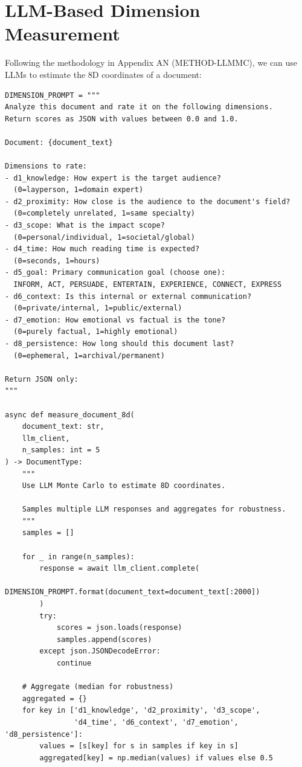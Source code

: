 \section{LLM-Based Dimension Measurement}
\label{sec:doctype-llm}

Following the methodology in Appendix AN (METHOD-LLMMC), we can use LLMs
to estimate the 8D coordinates of a document:

\begin{verbatim}
DIMENSION_PROMPT = """
Analyze this document and rate it on the following dimensions.
Return scores as JSON with values between 0.0 and 1.0.

Document: {document_text}

Dimensions to rate:
- d1_knowledge: How expert is the target audience?
  (0=layperson, 1=domain expert)
- d2_proximity: How close is the audience to the document's field?
  (0=completely unrelated, 1=same specialty)
- d3_scope: What is the impact scope?
  (0=personal/individual, 1=societal/global)
- d4_time: How much reading time is expected?
  (0=seconds, 1=hours)
- d5_goal: Primary communication goal (choose one):
  INFORM, ACT, PERSUADE, ENTERTAIN, EXPERIENCE, CONNECT, EXPRESS
- d6_context: Is this internal or external communication?
  (0=private/internal, 1=public/external)
- d7_emotion: How emotional vs factual is the tone?
  (0=purely factual, 1=highly emotional)
- d8_persistence: How long should this document last?
  (0=ephemeral, 1=archival/permanent)

Return JSON only:
"""

async def measure_document_8d(
    document_text: str,
    llm_client,
    n_samples: int = 5
) -> DocumentType:
    """
    Use LLM Monte Carlo to estimate 8D coordinates.

    Samples multiple LLM responses and aggregates for robustness.
    """
    samples = []

    for _ in range(n_samples):
        response = await llm_client.complete(
            DIMENSION_PROMPT.format(document_text=document_text[:2000])
        )
        try:
            scores = json.loads(response)
            samples.append(scores)
        except json.JSONDecodeError:
            continue

    # Aggregate (median for robustness)
    aggregated = {}
    for key in ['d1_knowledge', 'd2_proximity', 'd3_scope',
                'd4_time', 'd6_context', 'd7_emotion', 'd8_persistence']:
        values = [s[key] for s in samples if key in s]
        aggregated[key] = np.median(values) if values else 0.5


\end{verbatim}
